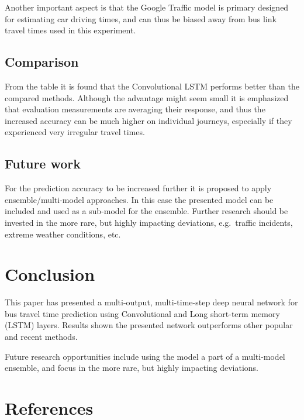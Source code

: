\documentclass[preprint,11pt,5p,twocolumn]{elsarticle}
\begin{document}
Another important aspect is that the Google Traffic model is primary designed for estimating car driving times, and can thus be biased away from bus link travel times used in this experiment.

\subsection{Comparison}
From the table it is found that the Convolutional LSTM performs better than the compared methods. Although the advantage might seem small it is emphasized that evaluation measurements are averaging their response, and thus the increased accuracy can be much higher on individual journeys, especially if they experienced very irregular travel times.



\subsection{Future work}
For the prediction accuracy to be increased further it is proposed to apply ensemble/multi-model approaches. In this case the presented model can be included and used as a sub-model for the ensemble. Further research should be invested in the more rare, but highly impacting deviations, e.g.\ traffic incidents, extreme weather conditions, etc.



\clearpage

\section{Conclusion}
\label{sec:conclusion}
This paper has presented a multi-output, multi-time-step deep neural network for bus travel time prediction using Convolutional and Long short-term memory (LSTM) layers. Results shown the presented network outperforms other popular and recent methods.

Future research opportunities include using the model a part of a multi-model ensemble, and focus in the more rare, but highly impacting deviations.

\section*{References}

%

\end{document}
